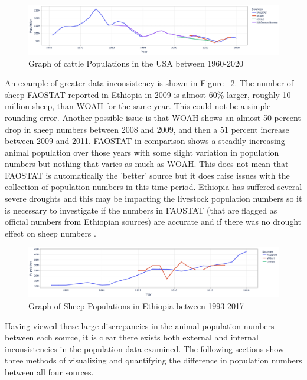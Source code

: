 \documentclass{article}
\begin{document}
\begin{figure}[h!]
    \centering
    \includegraphics[width=1\textwidth]{image1}
    \caption{Graph of cattle Populations in the USA between 1960-2020}
    \label{fig:image1}
\end{figure}

An example of greater data inconsistency is shown in Figure ~\ref{fig:image2}. The number of sheep FAOSTAT reported in Ethiopia in 2009 is almost 60\% larger, roughly 10 million sheep, than WOAH for the same year. This could not be a simple rounding error. Another possible issue is that WOAH shows an almost 50 percent drop in sheep numbers between 2008 and 2009, and then a 51 percent increase between 2009 and 2011. FAOSTAT in comparison shows a steadily increasing animal population over those years with some slight variation in population numbers but nothing that varies as much as WOAH. This does not mean that FAOSTAT is automatically the 'better' source but it does raise issues with the collection of population numbers in this time period. Ethiopia has suffered several severe droughts and this may be impacting the livestock population numbers so it is necessary to investigate if the numbers in FAOSTAT (that are flagged as official numbers from Ethiopian sources) are accurate and if there was no drought effect on sheep numbers \citep{bogale_drought_2022}.

\begin{figure}[h!]
    \centering
    \includegraphics[width=1\textwidth]{image2}
    \caption{Graph of Sheep Populations in Ethiopia between 1993-2017}
    \label{fig:image2}
\end{figure}


Having viewed these large discrepancies in the animal population numbers between each source, it is clear there exists both external and internal inconsistencies in the population data examined. The following sections show three methods of visualizing and quantifying the difference in population numbers between all four sources. 
\end{document}
